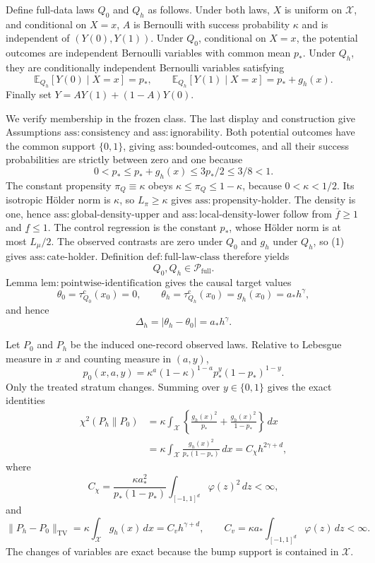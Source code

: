 Define full-data laws \(Q_0\) and \(Q_h\) as follows.  Under both laws, \(X\) is uniform on \(\mathcal X\), and conditional on \(X=x\), \(A\) is Bernoulli with success probability \(\kappa\) and is independent of \((Y(0),Y(1))\).  Under \(Q_0\), conditional on \(X=x\), the potential outcomes are independent Bernoulli variables with common mean \(p_*\).  Under \(Q_h\), they are conditionally independent Bernoulli variables satisfying
\[
 \mathbb E_{Q_h}[Y(0)\mid X=x]=p_* ,
 \qquad
 \mathbb E_{Q_h}[Y(1)\mid X=x]=p_*+g_h(x).
\tag{2}
\]
Finally set \(Y=AY(1)+(1-A)Y(0)\).

We verify membership in the frozen class.  The last display and construction give Assumptions \(\mathrm{ass{:}consistency}\) and \(\mathrm{ass{:}ignorability}\).  Both potential outcomes have the common support \(\{0,1\}\), giving \(\mathrm{ass{:}bounded\text{-}outcomes}\), and all their success probabilities are strictly between zero and one because
\[
 0<p_*\le p_*+g_h(x)\le3p_*/2\le3/8<1.
\tag{3}
\]
The constant propensity \(\pi_Q\equiv\kappa\) obeys \(\kappa\le\pi_Q\le1-\kappa\), because \(0<\kappa<1/2\).  Its isotropic H\"older norm is \(\kappa\), so \(L_\pi\ge\kappa\) gives \(\mathrm{ass{:}propensity\text{-}holder}\).  The density is one, hence \(\mathrm{ass{:}global\text{-}density\text{-}upper}\) and \(\mathrm{ass{:}local\text{-}density\text{-}lower}\) follow from \(\overline f\ge1\) and \(\underline f\le1\).  The control regression is the constant \(p_*\), whose H\"older norm is at most \(L_\mu/2\).  The observed contrasts are zero under \(Q_0\) and \(g_h\) under \(Q_h\), so (1) gives \(\mathrm{ass{:}cate\text{-}holder}\).  Definition \(\mathrm{def{:}full\text{-}law\text{-}class}\) therefore yields
\[
 Q_0,Q_h\in\mathcal P_{\mathrm{full}}.
\tag{4}
\]
Lemma \(\mathrm{lem{:}pointwise\text{-}identification}\) gives the causal target values
\[
 \theta_0=\tau_{Q_0}^{\mathrm c}(x_0)=0,
 \qquad
 \theta_h=\tau_{Q_h}^{\mathrm c}(x_0)=g_h(x_0)=a_*h^\gamma,
\]
and hence
\[
 \Delta_h=|\theta_h-\theta_0|=a_*h^\gamma.
\tag{5}
\]

Let \(P_0\) and \(P_h\) be the induced one-record observed laws.  Relative to Lebesgue measure in \(x\) and counting measure in \((a,y)\),
\[
 p_0(x,a,y)=\kappa^a(1-\kappa)^{1-a}p_*^y(1-p_*)^{1-y}.
\]
Only the treated stratum changes.  Summing over \(y\in\{0,1\}\) gives the exact identities
\[
 \begin{aligned}
 \chi^2(P_h\|P_0)
 &=\kappa\int_{\mathcal X}
   \left\{\frac{g_h(x)^2}{p_*}+\frac{g_h(x)^2}{1-p_*}\right\}\,dx\\
 &=\kappa\int_{\mathcal X}\frac{g_h(x)^2}{p_*(1-p_*)}\,dx
 =C_\chi h^{2\gamma+d},
 \end{aligned}
\tag{6}
\]
where
\[
 C_\chi=\frac{\kappa a_*^2}{p_*(1-p_*)}
 \int_{[-1,1]^d}\varphi(z)^2\,dz<\infty,
\]
and
\[
 \|P_h-P_0\|_{\mathrm{TV}}
 =\kappa\int_{\mathcal X}g_h(x)\,dx
 =C_vh^{\gamma+d},
 \qquad
 C_v=\kappa a_*\int_{[-1,1]^d}\varphi(z)\,dz<\infty.
\tag{7}
\]
The changes of variables are exact because the bump support is contained in \(\mathcal X\).

